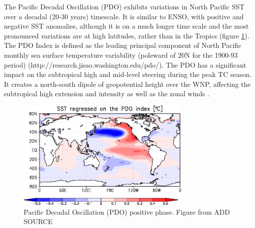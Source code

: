 The Pacific Decadal Oscillation (PDO) exhibits variations in North Pacific SST over a decadal (20-30 years) timescale. It is similar to ENSO, with positive and negative SST anomalies, although it is on a much longer time scale and the most pronounced variations are at high latitudes, rather than in the Tropics  (figure \ref{fig:PDO}). The PDO Index is defined as the leading principal component of North Pacific monthly sea surface temperature variability (poleward of 20N for the 1900-93 period) (http://research.jisao.washington.edu/pdo/). The PDO has a significant impact on the subtropical high and mid-level steering during the peak TC season. It creates a north-south dipole of geopotential height over the WNP, affecting the subtropical high extension and intensity as well as the zonal winds \citep{liu2008interdecadal}.


\begin{figure}[h]
	\centering
	\noindent\includegraphics[width=20pc,angle=0]{pdo_pattern.png}
	\caption{Pacific Decadal Oscillation (PDO) positive phase. Figure from ADD SOURCE }\label{fig:PDO}
\end{figure}






